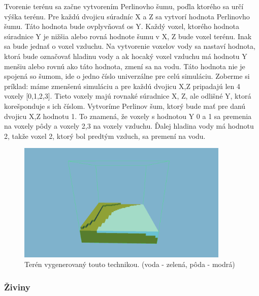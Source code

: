 \documentclass[12pt]{article}
\begin{document}
Tvorenie terénu sa začne vytvorením Perlinovho šumu, poďla ktorého sa určí výška terénu.
Pre každú dvojicu súradníc X a Z sa vytvorí hodnota Perlinovho šumu. Táto hodnota
bude ovplyvňovať os Y. Každý voxel, ktorého hodnota súradnice Y je nižšia alebo
rovná hodnote šumu v X, Z bude voxel terénu. Inak sa bude jednať o voxel
vzduchu. Na vytvorenie voxelov vody sa nastaví hodnota, ktorá bude označovať
hladinu vody a ak hocaký voxel vzduchu má hodnotu Y menšiu alebo rovnú ako táto
hodnota, zmení sa na vodu. Táto hodnota nie je spojená so šumom, ide o jedno
číslo univerzálne pre celú simuláciu. Zoberme si príklad: máme zmenšenú
simuláciu a pre každú dvojicu X,Z pripadajú len 4 voxely [0,1,2,3]. Tieto voxely
majú rovnaké súradnice X, Z, ale odlišné Y, ktorá korešponduje s ich číslom.
Vytvoríme Perlinov šum, ktorý bude mať pre danú dvojicu X,Z hodnotu 1. To
znamená, že voxely s hodnotou Y 0 a 1 sa premenia na voxely pôdy a voxely 2,3
na voxely vzduchu. Ďalej hladina vody má hodnotu 2, takže voxel 2, ktorý bol
predtým vzduch, sa premení na vodu.

\begin{figure}[ht]
	\centering
	\includegraphics[width=0.9\textwidth]{res/terrain.png}
	\caption{Terén vygenerovaný touto technikou. (voda - zelená, pôda - modrá)}
\end{figure}

\subsubsection{Živiny}
\end{document}
